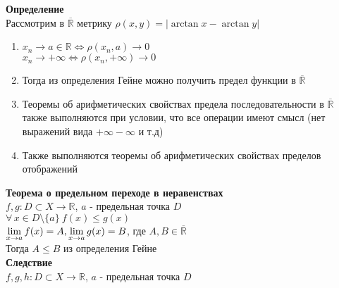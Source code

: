 \documentclass[12pt]{article}
\begin{document}
\textbf{Определение}\\
Рассмотрим в $\overline{\mathbb{R}}$ метрику $\rho(x,y) = |\arctan x - \arctan y|$
\begin{enumerate}
    \item $x_n\rightarrow a \in \mathbb{R} \Leftrightarrow \rho(x_n,a) \rightarrow 0$\\
    $x_n\rightarrow +\infty \Leftrightarrow \rho(x_n,+\infty) \rightarrow 0$
    \item Тогда из определения Гейне можно получить предел функции в $\overline{\mathbb{R}}$
    \item Теоремы об арифметических свойствах предела последовательности в $\overline{\mathbb{R}}$ также выполняются при условии, что все операции имеют смысл (нет выражений вида $+\infty-\infty$ и т.д)
    \item Также выполняются теоремы об арифметических свойствах пределов отображений\\
\end{enumerate}
\textbf{Теорема о предельном переходе в неравенствах}\\
$f,g:D\subset X \rightarrow \mathbb{R}$, $a$ - предельная точка $D$\\
$\forall\,x\in D\setminus\{a\}\ f(x) \leq g(x)$\\
$\lim\limits_{x\rightarrow a} f(x) = A, \lim\limits_{x\rightarrow a} g(x) = B$, где $A,B \in \overline{\mathbb{R}}$\\
Тогда $A\leq B$ из определения Гейне\\
\textbf{Следствие}\\
$f,g,h: D\subset X \rightarrow \mathbb{R}$, $a$ - предельная точка $D$\\
\end{document}
